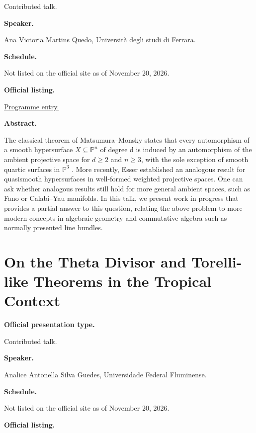 Contributed talk.

\medskip\noindent
{\bf Speaker.}

Ana Victoria Martins Quedo, Università degli
studi di Ferrara.

\medskip\noindent
{\bf Schedule.}

Not listed on the official site as of
November 20, 2026.

\medskip\noindent
{\bf Official listing.}

\href{%
https://sites.google.com/view/%
geoalgcompluff/legal/%
legal-2027-resumos#h.dant8g3oe5ea%
}{Programme entry.}

\medskip\noindent
{\bf Abstract.}

The classical theorem of Matsumura–Monsky
states that every automorphism of a smooth
hypersurface $X \subseteq \mathbb{P}^n$ of
degree d is induced by an automorphism of the
ambient projective space for $d \geq 2$ and
$n \geq 3$, with the sole exception of smooth
quartic surfaces in $\mathbb{P}^3$ . More
recently, Esser established an analogous
result for quasismooth hypersurfaces in
well-formed weighted projective spaces. One
can ask whether analogous results still hold
for more general ambient spaces, such as Fano
or Calabi–Yau manifolds. In this talk, we
present work in progress that provides a
partial answer to this question, relating the
above problem to more modern concepts in
algebraic geometry and commutative algebra
such as normally presented line bundles.

\section{On the Theta Divisor and
Torelli-like Theorems in the Tropical
Context}
\label{section-on-the-theta-divisor-and}

\medskip\noindent
{\bf Official presentation type.}

Contributed talk.

\medskip\noindent
{\bf Speaker.}

Analice Antonella Silva Guedes, Universidade
Federal Fluminense.

\medskip\noindent
{\bf Schedule.}

Not listed on the official site as of
November 20, 2026.

\medskip\noindent
{\bf Official listing.}


